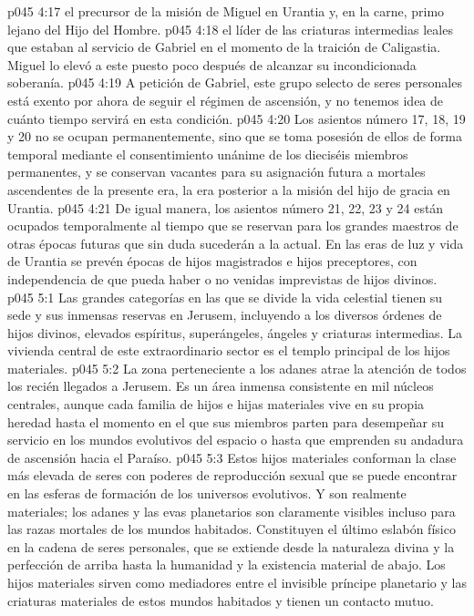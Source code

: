 \vs p045 4:17  el precursor de la misión de Miguel en Urantia y, en la carne, primo lejano del Hijo del Hombre.
\vs p045 4:18  el líder de las criaturas intermedias leales que estaban al servicio de Gabriel en el momento de la traición de Caligastia. Miguel lo elevó a este puesto poco después de alcanzar su incondicionada soberanía.
\vs p045 4:19 \pc A petición de Gabriel, este grupo selecto de seres personales está exento por ahora de seguir el régimen de ascensión, y no tenemos idea de cuánto tiempo servirá en esta condición.
\vs p045 4:20 Los asientos número 17, 18, 19 y 20 no se ocupan permanentemente, sino que se toma posesión de ellos de forma temporal mediante el consentimiento unánime de los dieciséis miembros permanentes, y se conservan vacantes para su asignación futura a mortales ascendentes de la presente era, la era posterior a la misión del hijo de gracia en Urantia.
\vs p045 4:21 De igual manera, los asientos número 21, 22, 23 y 24 están ocupados temporalmente al tiempo que se reservan para los grandes maestros de otras épocas futuras que sin duda sucederán a la actual. En las eras de luz y vida de Urantia se prevén épocas de hijos magistrados e hijos preceptores, con independencia de que pueda haber o no venidas imprevistas de hijos divinos.
\vs p045 5:1 Las grandes categorías en las que se divide la vida celestial tienen su sede y sus inmensas reservas en Jerusem, incluyendo a los diversos órdenes de hijos divinos, elevados espíritus, superángeles, ángeles y criaturas intermedias. La vivienda central de este extraordinario sector es el templo principal de los hijos materiales.
\vs p045 5:2 La zona perteneciente a los adanes atrae la atención de todos los recién llegados a Jerusem. Es un área inmensa consistente en mil núcleos centrales, aunque cada familia de hijos e hijas materiales vive en su propia heredad hasta el momento en el que sus miembros parten para desempeñar su servicio en los mundos evolutivos del espacio o hasta que emprenden su andadura de ascensión hacia el Paraíso.
\vs p045 5:3 Estos hijos materiales conforman la clase más elevada de seres con poderes de reproducción sexual que se puede encontrar en las esferas de formación de los universos evolutivos. Y son realmente materiales; los adanes y las evas planetarios son claramente visibles incluso para las razas mortales de los mundos habitados. Constituyen el último eslabón físico en la cadena de seres personales, que se extiende desde la naturaleza divina y la perfección de arriba hasta la humanidad y la existencia material de abajo. Los hijos materiales sirven como mediadores entre el invisible príncipe planetario y las criaturas materiales de estos mundos habitados y tienen un contacto mutuo.
